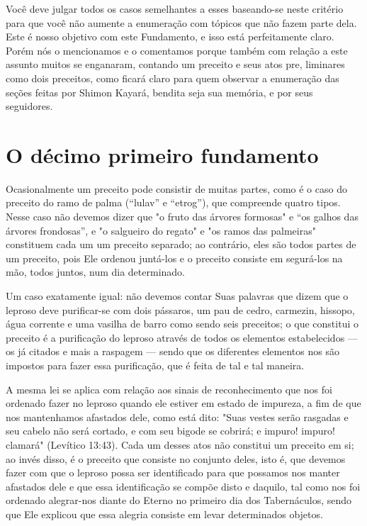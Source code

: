 Você deve julgar todos os casos semelhantes a esses baseando-se neste
critério para que você não aumente a enumeração com tópicos que não
fazem parte dela. Este é nosso objetivo com este Fundamento, e isso está
perfeitamente claro. Porém nós o mencionamos e o comentamos porque
também com rela­ção a este assunto muitos se enganaram, contando um
preceito e seus atos pre­, liminares como dois preceitos, como ficará
claro para quem observar a enume­ração das seções feitas por Shimon
Kayará, bendita seja sua memória, e por seus seguidores.

\chapter*{O décimo primeiro fundamento
}

Ocasionalmente um preceito pode consistir de muitas partes, como é o
caso do preceito do ramo de palma (``lulav'' e ``etrog''), que compreende
quatro tipos. Nesse caso não devemos dizer que "o fruto das árvores
formo­sas" e ``os galhos das árvores frondosas'', e "o salgueiro do
regato" e "os ra­mos das palmeiras" constituem cada um um preceito
separado; ao contrário, eles são todos partes de um preceito, pois Ele
ordenou juntá-los e o preceito consiste em segurá-los na mão, todos
juntos, num dia determinado.

Um caso exatamente igual: não devemos contar Suas palavras que dizem que
o leproso deve purificar-se com dois pássaros, um pau de cedro,
carmezin, hissopo, água corrente e uma vasilha de barro como sendo seis
pre­ceitos; o que constitui o preceito é a purificação do leproso
através de todos os elementos estabelecidos --- os já citados e mais a
raspagem --- sendo que os diferentes elementos nos são impostos para
fazer essa purificação, que é fei­ta de tal e tal maneira.

A mesma lei se aplica com relação aos sinais de reconhecimento que nos
foi ordenado fazer no leproso quando ele estiver em estado de impureza,
a fim de que nos mantenhamos afastados dele, como está dito: "Suas
vestes serão rasgadas e seu cabelo não será cortado, e com seu bigode se
cobrirá; e impuro! impuro! clamará" (Levítico 13:43). Cada um desses
atos não constitui um preceito em si; ao invés disso, é o preceito que
consiste no conjunto deles, isto é, que devemos 
fazer com que o leproso possa ser identificado para
que possamos nos manter afastados dele e que essa identificação se
compõe disto e daquilo, tal como nos foi ordenado alegrar-nos diante do
Eterno no primeiro dia dos Tabernáculos, sendo que Ele explicou que essa
alegria consiste em le­var determinados objetos.

